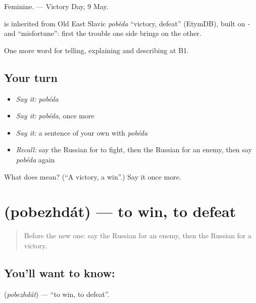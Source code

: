 Feminine. \emph{ } — Victory Day, 9 May.

\begin{cousinweb}
\emph{} is inherited from Old East Slavic \emph{poběda} \textquotedblleft{}victory, defeat\textquotedblright{} (EtymDB), built on \emph{-} and \emph{} \textquotedblleft{}misfortune\textquotedblright{}: first the trouble one side brings on the other.
\end{cousinweb}

\begin{grammarlens}[title={What you've built}]
One more word for telling, explaining and describing at B1.
\end{grammarlens}

\subsection*{Your turn}
\begin{itemize}
\raggedright
  \item \emph{Say it:} \emph{pobéda}
  \item \emph{Say it:} \emph{pobéda}, once more
  \item \emph{Say it:} a sentence of your own with \emph{pobéda}
  \item \emph{Recall:} say the Russian for to fight, then the Russian for an enemy, then say \emph{pobéda} again
\end{itemize}

\begin{tcolorbox}[breakable,colback=teal!4,colframe=teal!35!black,title={Before you move on}]
What does  mean? (\textquotedblleft{}A victory, a win\textquotedblright{}.) Say it once more.
\end{tcolorbox}
\section[\texorpdfstring{\ru{побеждать} (pobezhdát)}{побеждать (pobezhdát)}]{ (pobezhdát) — to win, to defeat}

\label{lesson:RU-C324-pobezhdat}



\begin{quote}
Before the new one: say the Russian for an enemy, then the Russian for a victory.
\end{quote}

\subsection*{You'll want to know: }
\textbf{} (\emph{pobezhdát}) — \textquotedblleft{}to win, to defeat\textquotedblright{}.

